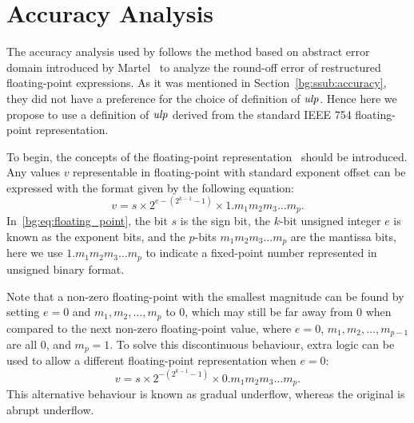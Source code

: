 \section{Accuracy Analysis}
\label{so:sec:accuracy}

The accuracy analysis used by \soap{} follows the method based on abstract
error domain introduced by Martel~\cite{martel07} to analyze the round-off
error of restructured floating-point expressions.  As it was mentioned in
Section~\ref{bg:ssub:accuracy}, they did not have a preference for the choice
of definition of $\operatorname{\mathit{ulp}}$.  Hence here we propose to use a definition of $\operatorname{\mathit{ulp}}$
derived from the standard IEEE 754 floating-point representation.

To begin, the concepts of the floating-point representation~\cite{ieee754}
should be introduced.  Any values $v$ representable in floating-point with
standard exponent offset can be expressed with the format given by the
following equation:
\begin{equation}
    v = s \times 2^{e - (2^{k - 1} - 1)} \times 1.{m_1 m_2 m_3 \ldots m_p}.
    \label{bg:eq:floating_point}
\end{equation}
In~\eqref{bg:eq:floating_point}, the bit $s$ is the sign bit, the $k$-bit
unsigned integer $e$ is known as the exponent bits, and the $p$-bits $m_1 m_2
m_3 \ldots m_p$ are the mantissa bits, here we use $1.{m_1 m_2 m_3 \ldots m_p}$
to indicate a fixed-point number represented in unsigned binary format.

Note that a non-zero floating-point with the smallest magnitude can be found
by setting $e = 0$ and $m_1, m_2, \ldots, m_p$ to $0$, which may still be far
away from $0$ when compared to the next non-zero floating-point value, where
$e = 0$, $m_1, m_2, \ldots, m_{p-1}$ are all $0$, and $m_p = 1$.  To solve
this discontinuous behaviour, extra logic can be used to allow a different
floating-point representation when $e = 0$:
\begin{equation}
    v = s \times 2^{-(2^{k-1} - 1)} \times 0.{m_1 m_2 m_3 \ldots m_p}.
\end{equation}
This alternative behaviour is known as gradual underflow, whereas the original
is abrupt underflow.

